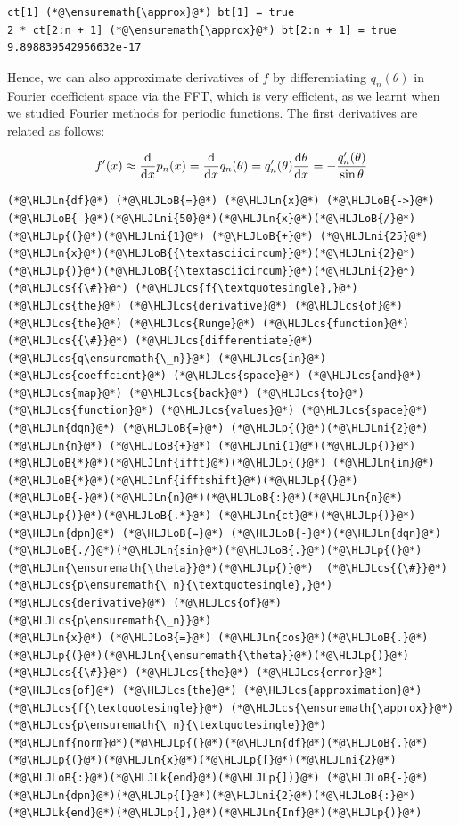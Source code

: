 \documentclass[12pt,a4paper]{article}
\newcommand{\HLJLk}[1]{\textcolor[RGB]{148,91,176}{\textbf{#1}}}
\newcommand{\HLJLn}[1]{#1}
\newcommand{\HLJLnf}[1]{\textcolor[RGB]{66,102,213}{#1}}
\newcommand{\HLJLni}[1]{\textcolor[RGB]{59,151,46}{#1}}
\newcommand{\HLJLoB}[1]{\textcolor[RGB]{102,102,102}{\textbf{#1}}}
\newcommand{\HLJLp}[1]{#1}
\newcommand{\HLJLcs}[1]{\textcolor[RGB]{153,153,119}{\textit{#1}}}
\begin{document}
\begin{lstlisting}
ct[1] (*@\ensuremath{\approx}@*) bt[1] = true
2 * ct[2:n + 1] (*@\ensuremath{\approx}@*) bt[2:n + 1] = true
9.898839542956632e-17
\end{lstlisting}


Hence, we can also approximate derivatives of $f$ by differentiating $q_n(\theta)$ in Fourier coefficient space via the FFT, which is very efficient, as we learnt when we studied Fourier methods for periodic functions. The first derivatives are related as follows:

\[
f'(x) \approx \frac{{\rm d}}{{\rm d}x}p_n(x) = \frac{{\rm d}}{{\rm d}x}q_n(\theta) = q_n'(\theta)\frac{{\rm d} \theta}{\mathrm{d}x} = -\frac{q_n'(\theta)}{\sin \theta}
\]

\begin{lstlisting}
(*@\HLJLn{df}@*) (*@\HLJLoB{=}@*) (*@\HLJLn{x}@*) (*@\HLJLoB{->}@*) (*@\HLJLoB{-}@*)(*@\HLJLni{50}@*)(*@\HLJLn{x}@*)(*@\HLJLoB{/}@*)(*@\HLJLp{(}@*)(*@\HLJLni{1}@*) (*@\HLJLoB{+}@*) (*@\HLJLni{25}@*)(*@\HLJLn{x}@*)(*@\HLJLoB{{\textasciicircum}}@*)(*@\HLJLni{2}@*)(*@\HLJLp{)}@*)(*@\HLJLoB{{\textasciicircum}}@*)(*@\HLJLni{2}@*) (*@\HLJLcs{{\#}}@*) (*@\HLJLcs{f{\textquotesingle},}@*) (*@\HLJLcs{the}@*) (*@\HLJLcs{derivative}@*) (*@\HLJLcs{of}@*) (*@\HLJLcs{the}@*) (*@\HLJLcs{Runge}@*) (*@\HLJLcs{function}@*)
(*@\HLJLcs{{\#}}@*) (*@\HLJLcs{differentiate}@*) (*@\HLJLcs{q\ensuremath{\_n}}@*) (*@\HLJLcs{in}@*) (*@\HLJLcs{coeffcient}@*) (*@\HLJLcs{space}@*) (*@\HLJLcs{and}@*) (*@\HLJLcs{map}@*) (*@\HLJLcs{back}@*) (*@\HLJLcs{to}@*) (*@\HLJLcs{function}@*) (*@\HLJLcs{values}@*) (*@\HLJLcs{space}@*)
(*@\HLJLn{dqn}@*) (*@\HLJLoB{=}@*) (*@\HLJLp{(}@*)(*@\HLJLni{2}@*)(*@\HLJLn{n}@*) (*@\HLJLoB{+}@*) (*@\HLJLni{1}@*)(*@\HLJLp{)}@*)(*@\HLJLoB{*}@*)(*@\HLJLnf{ifft}@*)(*@\HLJLp{(}@*) (*@\HLJLn{im}@*)(*@\HLJLoB{*}@*)(*@\HLJLnf{ifftshift}@*)(*@\HLJLp{(}@*)(*@\HLJLoB{-}@*)(*@\HLJLn{n}@*)(*@\HLJLoB{:}@*)(*@\HLJLn{n}@*)(*@\HLJLp{)}@*)(*@\HLJLoB{.*}@*) (*@\HLJLn{ct}@*)(*@\HLJLp{)}@*) 
(*@\HLJLn{dpn}@*) (*@\HLJLoB{=}@*) (*@\HLJLoB{-}@*)(*@\HLJLn{dqn}@*) (*@\HLJLoB{./}@*)(*@\HLJLn{sin}@*)(*@\HLJLoB{.}@*)(*@\HLJLp{(}@*)(*@\HLJLn{\ensuremath{\theta}}@*)(*@\HLJLp{)}@*)  (*@\HLJLcs{{\#}}@*) (*@\HLJLcs{p\ensuremath{\_n}{\textquotesingle},}@*) (*@\HLJLcs{derivative}@*) (*@\HLJLcs{of}@*) (*@\HLJLcs{p\ensuremath{\_n}}@*)
(*@\HLJLn{x}@*) (*@\HLJLoB{=}@*) (*@\HLJLn{cos}@*)(*@\HLJLoB{.}@*)(*@\HLJLp{(}@*)(*@\HLJLn{\ensuremath{\theta}}@*)(*@\HLJLp{)}@*)
(*@\HLJLcs{{\#}}@*) (*@\HLJLcs{the}@*) (*@\HLJLcs{error}@*) (*@\HLJLcs{of}@*) (*@\HLJLcs{the}@*) (*@\HLJLcs{approximation}@*) (*@\HLJLcs{f{\textquotesingle}}@*) (*@\HLJLcs{\ensuremath{\approx}}@*) (*@\HLJLcs{p\ensuremath{\_n}{\textquotesingle}}@*)
(*@\HLJLnf{norm}@*)(*@\HLJLp{(}@*)(*@\HLJLn{df}@*)(*@\HLJLoB{.}@*)(*@\HLJLp{(}@*)(*@\HLJLn{x}@*)(*@\HLJLp{[}@*)(*@\HLJLni{2}@*)(*@\HLJLoB{:}@*)(*@\HLJLk{end}@*)(*@\HLJLp{])}@*) (*@\HLJLoB{-}@*) (*@\HLJLn{dpn}@*)(*@\HLJLp{[}@*)(*@\HLJLni{2}@*)(*@\HLJLoB{:}@*)(*@\HLJLk{end}@*)(*@\HLJLp{],}@*)(*@\HLJLn{Inf}@*)(*@\HLJLp{)}@*)
\end{lstlisting}
\end{document}
